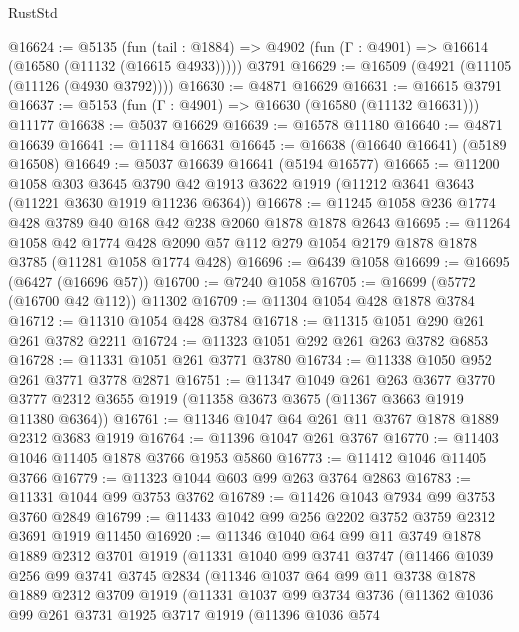 \begin{lexlean}{RustStd}
\begin{coremodule}
{\begin{coremodule}
{{{{{{{{{{{{{{{{{{{{{{{{{{{{{@16624 := @5135
    (fun (tail : @1884) => @4902 (fun (Γ : @4901) => @16614 (@16580 (@11132 (@16615 @4933)))))
    @3791
@16629 := @16509 (@4921 (@11105 (@11126 (@4930 @3792))))
@16630 := @4871 @16629
@16631 := @16615 @3791
@16637 := @5153 (fun (Γ : @4901) => @16630 (@16580 (@11132 @16631))) @11177
@16638 := @5037 @16629
@16639 := @16578 @11180
@16640 := @4871 @16639
@16641 := @11184 @16631
@16645 := @16638 (@16640 @16641) (@5189 @16508)
@16649 := @5037 @16639 @16641 (@5194 @16577)
@16665 := @11200
    @1058
    @303
    @3645
    @3790
    @42
    @1913
    @3622
    @1919
    (@11212 @3641 @3643 (@11221 @3630 @1919 @11236 @6364))
@16678 := @11245 @1058 @236 @1774 @428 @3789 @40 @168 @42 @238 @2060 @1878 @1878 @2643
@16695 := @11264
    @1058
    @42
    @1774
    @428
    @2090
    @57
    @112
    @279
    @1054
    @2179
    @1878
    @1878
    @3785
    (@11281 @1058 @1774 @428)
@16696 := @6439 @1058
@16699 := @16695 (@6427 (@16696 @57))
@16700 := @7240 @1058
@16705 := @16699 (@5772 (@16700 @42 @112)) @11302
@16709 := @11304 @1054 @428 @1878 @3784
@16712 := @11310 @1054 @428 @3784
@16718 := @11315 @1051 @290 @261 @261 @3782 @2211
@16724 := @11323 @1051 @292 @261 @263 @3782 @6853
@16728 := @11331 @1051 @261 @3771 @3780
@16734 := @11338 @1050 @952 @261 @3771 @3778 @2871
@16751 := @11347
    @1049
    @261
    @263
    @3677
    @3770
    @3777
    @2312
    @3655
    @1919
    (@11358 @3673 @3675 (@11367 @3663 @1919 @11380 @6364))
@16761 := @11346 @1047 @64 @261 @11 @3767 @1878 @1889 @2312 @3683 @1919
@16764 := @11396 @1047 @261 @3767
@16770 := @11403 @1046 @11405 @1878 @3766 @1953 @5860
@16773 := @11412 @1046 @11405 @3766
@16779 := @11323 @1044 @603 @99 @263 @3764 @2863
@16783 := @11331 @1044 @99 @3753 @3762
@16789 := @11426 @1043 @7934 @99 @3753 @3760 @2849
@16799 := @11433 @1042 @99 @256 @2202 @3752 @3759 @2312 @3691 @1919 @11450
@16920 := @11346
    @1040
    @64
    @99
    @11
    @3749
    @1878
    @1889
    @2312
    @3701
    @1919
    (@11331
      @1040
      @99
      @3741
      @3747
      (@11466
        @1039
        @256
        @99
        @3741
        @3745
        @2834
        (@11346
          @1037
          @64
          @99
          @11
          @3738
          @1878
          @1889
          @2312
          @3709
          @1919
          (@11331
            @1037
            @99
            @3734
            @3736
            (@11362
              @1036
              @99
              @261
              @3731
              @1925
              @3717
              @1919
              (@11396
                @1036
                @574
}}}}}}}}}}}}}}}}}}}}}}}}}}}}}
\end{coremodule}}
\end{coremodule}
\end{lexlean}

